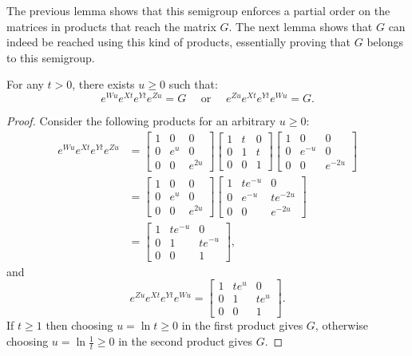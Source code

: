 The previous lemma shows that this semigroup enforces a partial order on the matrices
in products that reach the matrix $G$. The next lemma shows that $G$ can indeed be reached using this
kind of products, essentially proving that $G$ belongs to this semigroup.

\begin{proposition}\label{prop:forced_order_exists}
For any $t>0$, there exists $u\geqslant0$ such that:
\[e^{Wu}e^{Xt}e^{Yt}e^{Zu}=G\quad\text{ or }\quad e^{Zu}e^{Xt}e^{Yt}e^{Wu}=G.\]
\end{proposition}

\begin{proof}
Consider the following products for an arbitrary $u\geqslant0$:
\begin{align*}
e^{Wu}e^{Xt}e^{Yt}e^{Zu}&=\begin{bmatrix}1&0&0\\0&e^u&0\\0&0&e^{2u}\end{bmatrix}
    \begin{bmatrix}1&t&0\\0&1&t\\0&0&1\end{bmatrix}
    \begin{bmatrix}1&0&0\\0&e^{-u}&0\\0&0&e^{-2u}\end{bmatrix}\\
&=\begin{bmatrix}1&0&0\\0&e^u&0\\0&0&e^{2u}\end{bmatrix}
    \begin{bmatrix}1&te^{-u}&0\\0&e^{-u}&te^{-2u}\\0&0&e^{-2u}\end{bmatrix}\\
&=\begin{bmatrix}1&te^{-u}&0\\0&1&te^{-u}\\0&0&1\end{bmatrix},
\end{align*}
and
\[
e^{Zu}e^{Xt}e^{Yt}e^{Wu}=\begin{bmatrix}1&te^{u}&0\\0&1&te^{u}\\0&0&1\end{bmatrix}.
\]
If $t\geqslant1$ then choosing $u=\ln t\geqslant0$ in the first product gives $G$,
otherwise choosing $u=\ln\frac{1}{t}\geqslant0$ in the second product gives $G$.
\end{proof}

